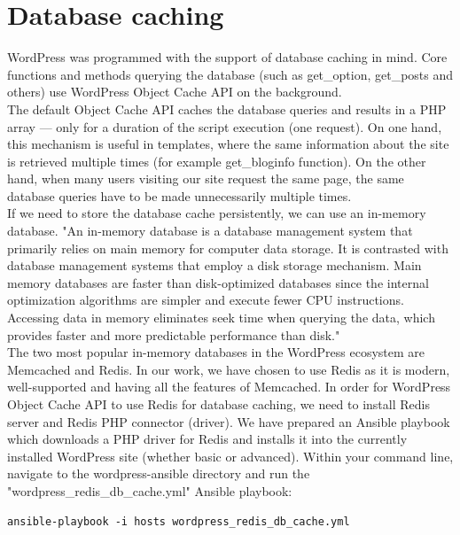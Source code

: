 \section{Database caching}

WordPress was programmed with the support of database caching in mind. Core functions and methods querying the database (such as get\_option, get\_posts and others) use WordPress Object Cache API \cite{WP:Object-Cache-API} on the background. \\

The default Object Cache API caches the database queries and results in a PHP array — only for a duration of the script execution (one request). On one hand, this mechanism is useful in templates, where the same information about the site is retrieved multiple times (for example get\_bloginfo function). On the other hand, when many users visiting our site request the same page, the same database queries have to be made unnecessarily multiple times. \\

If we need to store the database cache persistently, we can use an in-memory database. "An in-memory database is a database management system that primarily relies on main memory for computer data storage. It is contrasted with database management systems that employ a disk storage mechanism. Main memory databases are faster than disk-optimized databases since the internal optimization algorithms are simpler and execute fewer CPU instructions. Accessing data in memory eliminates seek time when querying the data, which provides faster and more predictable performance than disk." \cite{Wiki:in-memory-database}\\

The two most popular in-memory databases in the WordPress ecosystem are Memcached and Redis. In our work, we have chosen to use Redis as it is modern, well-supported and having all the features of Memcached. \cite{SO:Redis-vs-Memcached} In order for WordPress Object Cache API to use Redis for database caching, we need to install Redis server and Redis PHP connector (driver). We have prepared an Ansible playbook which downloads a PHP driver for Redis and installs it into the currently installed WordPress site (whether basic or advanced). Within your command line, navigate to the wordpress-ansible directory and run the "wordpress\_redis\_db\_cache.yml" Ansible playbook:

\begin{lstlisting}
ansible-playbook -i hosts wordpress_redis_db_cache.yml
\end{lstlisting}

